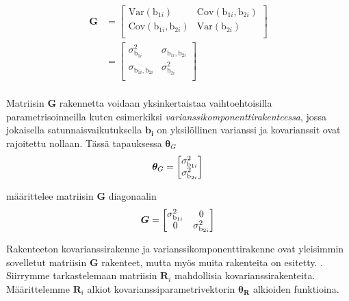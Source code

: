\documentclass[finnish]{docopts}
\begin{document}
$$
\begin{aligned}
\bm{G} &=
\begin{bmatrix}
\text{Var}(\text{b}_{1i}) & \text{Cov}(\text{b}_{1i}, \text{b}_{2i}) \\
\text{Cov}(\text{b}_{1i}, \text{b}_{2i}) & \text{Var}(\text{b}_{2i}) \\
\end{bmatrix} \\
&=
\begin{bmatrix}
\sigma^2_{\text{b}_{1i}} & \sigma_{\text{b}_{1i}, \text{b}_{2i}} \\
\sigma_{\text{b}_{1i}, \text{b}_{2i}} & \sigma^2_{\text{b}_{2i}} \\
\end{bmatrix} \\
\end{aligned}
$$

Matriisin $\bm{G}$ rakennetta voidaan yksinkertaistaa vaihtoehtoisilla parametrisoinneilla kuten esimerkiksi \textit{varianssikomponenttirakenteessa}, jossa jokaisella satunnaisvaikutuksella $\bm{b_i}$ on yksilöllinen varianssi ja kovarianssit ovat rajoitettu nollaan. Tässä tapauksessa $\bm{\theta}_G$ \\

$$
\bm{\theta}_G =
\begin{bmatrix}
\sigma^2_{\text{b}_{1i}}\\
\sigma^2_{\text{b}_{2i}} \\
\end{bmatrix}\\
$$

määrittelee matriisin $\bm{G}$ diagonaalin \\

$$
\bm{G} =
\begin{bmatrix}
\sigma^2_{\text{b}_{1i}} & 0 \\
0 & \sigma^2_{\text{b}_{2i}} \\
\end{bmatrix} \\
$$

Rakenteeton kovarianssirakenne ja varianssikomponenttirakenne ovat yleisimmin sovelletut matriisin $\bm{G}$ rakenteet, mutta myös muita rakenteita on esitetty. \citep{west14}. \\

Siirrymme tarkastelemaan matriisin $\bm{R}_i$ mahdollisia kovarianssirakenteita. Määrittelemme $\bm{R}_i$ alkiot kovarianssiparametrivektorin $\bm{\theta_R}$ alkioiden funktioina.\\
\end{document}
